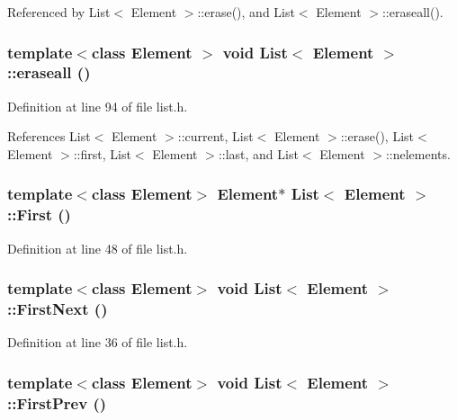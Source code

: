 Referenced by List$<$ Element $>$::erase(), and List$<$ Element $>$::eraseall().\hypertarget{classList_b69f9a25fa64a36b2682617ee4e366db}{
\subsubsection[{eraseall}]{\setlength{\rightskip}{0pt plus 5cm}template$<$class Element $>$ void {\bf List}$<$ Element $>$::eraseall ()}}
\label{classList_b69f9a25fa64a36b2682617ee4e366db}




Definition at line 94 of file list.h.

References List$<$ Element $>$::current, List$<$ Element $>$::erase(), List$<$ Element $>$::first, List$<$ Element $>$::last, and List$<$ Element $>$::nelements.\hypertarget{classList_ce217a2fdab3ec404fd4f6d9609af830}{
\subsubsection[{First}]{\setlength{\rightskip}{0pt plus 5cm}template$<$class Element$>$ Element$\ast$ {\bf List}$<$ Element $>$::First ()}}
\label{classList_ce217a2fdab3ec404fd4f6d9609af830}




Definition at line 48 of file list.h.\hypertarget{classList_6826ef4c46c838156e9cbb839b4ae20f}{
\subsubsection[{FirstNext}]{\setlength{\rightskip}{0pt plus 5cm}template$<$class Element$>$ void {\bf List}$<$ Element $>$::FirstNext ()}}
\label{classList_6826ef4c46c838156e9cbb839b4ae20f}




Definition at line 36 of file list.h.\hypertarget{classList_841b8ba447b229dafa684faa36cd23ae}{
\subsubsection[{FirstPrev}]{\setlength{\rightskip}{0pt plus 5cm}template$<$class Element$>$ void {\bf List}$<$ Element $>$::FirstPrev ()}}
\label{classList_841b8ba447b229dafa684faa36cd23ae}




